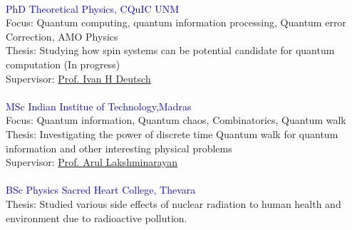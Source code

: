 \documentclass[14pt]{moderncv}
\begin{document}
\\


\begin{minipage}{0.12\textwidth} 
\end{minipage}
\begin{minipage}{0.8\textwidth}
\textcolor{blue}{PhD Theoretical Physics, CQuIC UNM}\\
Focus: Quantum computing, quantum information processing, Quantum error Correction, AMO Physics\\
Thesis: Studying how spin systems can be potential candidate for quantum computation (In progress)\\
Supervisor: \href{https://cquic.unm.edu/research/research-groups/deutsch-research-group/index.html}{Prof. Ivan H Deutsch}\\\\
\textcolor{blue}{MSc Indian Institue of Technology,Madras}\\
Focus: Quantum information, Quantum chaos, Combinatorics, Quantum walk\\
Thesis: Investigating the power of discrete time Quantum walk for quantum information and other interesting physical problems\\
Supervisor: \href{https://sites.google.com/view/arulakshminarayan/home}{Prof. Arul Lakshminarayan}\\\\
\textcolor{blue}{BSc Physics Sacred Heart College, Thevara}\\
Thesis: Studied various side effects of nuclear radiation to human health and environment due to radioactive pollution.
\end{minipage}\\
\end{document}

